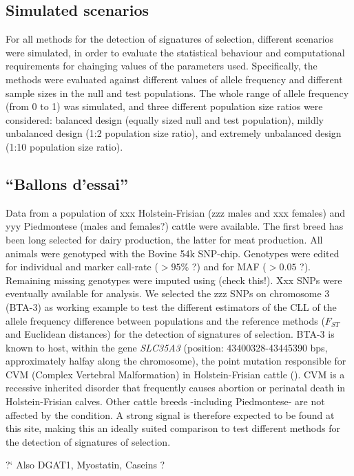 \documentclass{bmcart}
\begin{document}
\subsection*{Simulated scenarios}
For all methods for the detection of signatures of selection, different
scenarios were simulated, in order to evaluate the statistical behaviour
and computational requirements for chainging values of the parameters
used. Specifically, the methods were evaluated against different values
of allele frequency and different sample sizes in the null and test
populations. The whole range of allele frequency (from 0 to 1) was
simulated, and three different population size ratios were considered:
balanced design (equally sized null and test population), mildly
unbalanced design (1:2 population size ratio), and extremely unbalanced
design (1:10 population size ratio).

\subsection*{``Ballons d'essai''}

Data from a population of xxx Holstein-Frisian (zzz males and xxx
females) and yyy Piedmontese (males and females?)
cattle were available. The first breed has been long selected for dairy
production, the latter for meat production. All animals were genotyped
with the Bovine 54k SNP-chip. Genotypes were edited for individual and
marker call-rate ($>95\%$ ?) and for MAF ($>0.05$ ?). Remaining missing
genotypes were imputed using (check this!). Xxx SNPs were eventually
available for analysis. We selected the zzz SNPs on chromosome 3 (BTA-3) as
working example to test the different estimators of the CLL of the
allele frequency difference between populations and the reference
methods ($F_{ST}$ and Euclidean distances) for the detection of
signatures of selection.
BTA-3 is known to host, within the gene \emph{SLC35A3} (position:
43400328-43445390 bps, approximately halfay along the chromosome), the point mutation responsible for CVM (Complex
Vertebral Malformation) in Holstein-Frisian cattle (\cite{thomsen2006missense}).  
CVM is a recessive inherited disorder that frequently causes abortion or perinatal
death in Holstein-Frisian calves. Other cattle breeds -including Piedmontese- are not affected by
the condition. A strong signal is therefore expected to be found at this
site, making this an ideally suited comparison to test different methods
for the detection of signatures of selection.

?` Also DGAT1, Myostatin, Caseins ?
\end{document}
